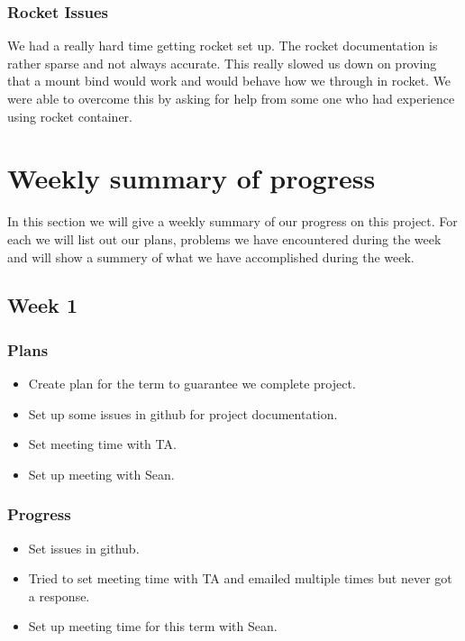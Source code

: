 \documentclass[onecolumn, draftclsnofoot,10pt, compsoc]{article}
\begin{document}
			\subsubsection{Rocket Issues} We had a really hard time getting rocket set up. The rocket documentation is rather sparse and not always accurate. This really slowed us down on proving that a mount bind would work and would behave how we through in rocket. We were able to overcome this by asking for help from some one who had experience using rocket container.\\


\section{Weekly summary of progress}
	   In this section we will give a weekly summary of our progress on this project. For each we will list out our plans, problems we have encountered during the week and will show a summery of what we have accomplished during the week.\\
		
		\subsection{Week 1}
			\subsubsection{Plans}
			    \begin{itemize}
			        \item Create plan for the term to guarantee we complete project.\\
			        \item Set up some issues in github for project documentation.\\
			        \item Set meeting time with TA.\\
			        \item Set up meeting with Sean.\\
			    \end{itemize}
			\subsubsection{Progress}
			    \begin{itemize}
			        \item Set issues in github.\\
			        \item Tried to set meeting time with TA and emailed multiple times but never got a response.\\
			        \item Set up meeting time for this term with Sean.\\
			    \end{itemize}
			    
\end{document}
